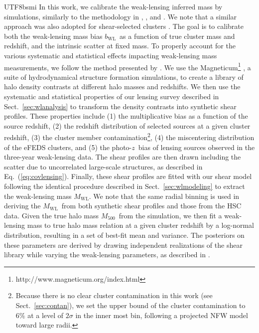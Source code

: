 \documentclass[longauth]{aa}
\newcommand{\Mfiveoo}{\ensuremath{M_{500}}}
\newcommand{\redshift}{\ensuremath{z}}
\newcommand{\bwl}{\ensuremath{b_{\mathrm{WL}}}}
\newcommand{\Mwl}{\ensuremath{M_{\mathrm{WL}}}}
\newcommand{\percent}{\ensuremath{\%}}
\begin{document}
\begin{CJK*}{UTF8}{bsmi}
In this work, we calibrate the weak-lensing inferred mass by simulations, similarly to the methodology in \cite{schrabback18}, \cite{dietrich19}, and \cite{sommer21}.
We note that a similar approach was also adopted for shear-selected clusters \citep{chen20}.
The goal is to calibrate both the weak-lensing mass bias \bwl\ as a function of  true cluster mass and redshift, and the intrinsic scatter at fixed mass.
To properly account for the various systematic and statistical effects impacting weak-lensing mass measurements, we follow the method presented by \cite{grandis21}. 
We use the Magneticum\footnote{http://www.magneticum.org/index.html} \citep{dolag21}, a suite of hydrodynamical structure formation simulations, to create a library of halo density contrasts at different halo masses and redshifts. 
We then use the systematic and statistical properties of our lensing survey described in Sect.~\ref{sec:wlanalysis} to transform the density contrasts into synthetic shear profiles. 
These properties include (1) the multiplicative bias as a function of the source redshift, (2) the redshift distribution of selected sources at a given cluster redshift, (3) the cluster member contamination\footnote{Because there is no clear cluster contamination in this work (see Sect.~\ref{sec:contan}), we set the upper bound of the cluster contamination to $6\percent$ at a level of $2\sigma$ in the inner most bin, following a projected NFW model toward large radii.}, (4) the miscentering distribution of the eFEDS clusters, and (5) the photo-\redshift\ bias of lensing sources observed in the three-year weak-lensing data.
The shear profiles are then drawn including the scatter due to uncorrelated large-scale structures, as described in Eq.~(\ref{eq:covlensing}).
Finally, these shear profiles are fitted with our shear model following the identical procedure described in Sect.~\ref{sec:wlmodeling} to extract the weak-lensing mass \Mwl.
We note that the same radial binning is used in deriving the \Mwl\ from both synthetic shear profiles and those from the HSC data. 
Given the true halo mass \Mfiveoo\ from the simulation, we then fit a weak-lensing mass to true halo mass relation at a given cluster redshift by a log-normal distribution, resulting in a set of best-fit mean and variance.
The posteriors on these parameters are derived by drawing independent realizations of the shear library while varying the weak-lensing parameters, as described in \cite{grandis21}.



\end{CJK*}
\end{document}
